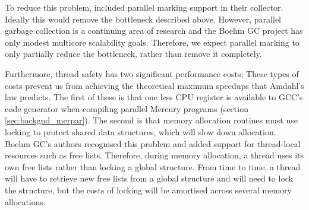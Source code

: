 To reduce this problem,
\citet{boehm:1988:gc} included parallel marking support in their collector.
Ideally this would remove the bottleneck described above.
However,
parallel garbage collection is a continuing area of research and
the Boehm GC project has only modest multicore scalability goals.
Therefore,
we expect parallel marking to only partially reduce the bottleneck,
rather than remove it completely.

Furthermore, thread safety has two significant performance costs;
These types of costs prevent us from achieving the theoretical maximum
speedups that Amdahl's law predicts.
The first of these is that
one less CPU register is available to GCC's code generator when compiling
parallel Mercury programs (section \ref{sec:backgnd_merpar}).
The second is that
memory allocation routines must use locking to protect shared data
structures,
which will slow down allocation.
Boehm GC's authors recognised this problem and
added support for thread-local resources such as free lists.
Therefore,
during memory allocation,
a thread uses its own free lists rather than locking a global structure.
From time to time, a thread will have to retrieve new free lists
from a global structure and will need to lock the structure,
but the costs of locking will be amortised across several memory allocations.


